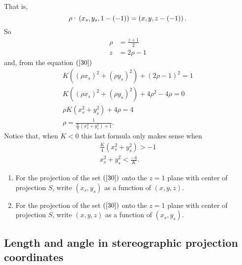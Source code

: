 \documentclass{ximera}
\begin{document}
That is,%
\[
\rho\text{\textperiodcentered}\left(  x_{s},y_{s},1-\left(  -1\right)
\right)  =\left(  x,y,z-\left(  -1\right)  \right)  .
\]
So%
\begin{align*}
\rho &  =\frac{z+1}{2}\\
z  &  =2\rho-1
\end{align*}
and, from the equation $\left(  \ref{30}\right)  $%
\begin{gather*}
K\left(  \left(  \rho x_{s}\right)  ^{2}+\left(  \rho y_{s}\right)
^{2}\right)  +\left(  2\rho-1\right)  ^{2}=1\\
K\left(  \left(  \rho x_{s}\right)  ^{2}+\left(  \rho y_{s}\right)
^{2}\right)  +4\rho^{2}-4\rho=0\\
\rho K\left(  x_{s}^{2}+y_{s}^{2}\right)  +4\rho=4\\
\rho=\frac{1}{\frac{K}{4}\left(  x_{s}^{2}+y_{s}^{2}\right)  +1}.
\end{gather*}
Notice that, when $K<0$ this last formula only makes sense when%
\begin{gather*}
\frac{K}{4}\left(  x_{s}^{2}+y_{s}^{2}\right)  >-1\\
x_{s}^{2}+y_{s}^{2}<\frac{-4}{K}.
\end{gather*}


\begin{exercise}\label{35}\hfil
\begin{enumerate}
\item For the projection of the set $\left(  \ref{30}\right)  $ onto
the $z=1$ plane with center of projection $S$, write $\left(  x_{s}%
,y_{s}\right)  $ as a function of $\left(  x,y,z\right)  $.
\item For the projection of the set $\left(  \ref{30}\right)  $ onto the $z=1$
plane with center of projection $S$, write $\left(  x,y,z\right)  $ as a
function of $\left(  x_{s},y_{s}\right)  $.
\end{enumerate}
\end{exercise}

\subsection*{Length and angle in stereographic projection coordinates}
\end{document}
